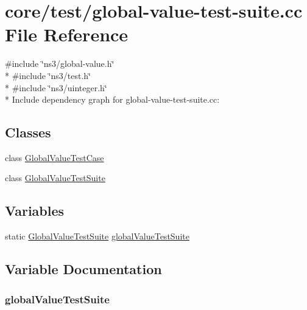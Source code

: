 \hypertarget{global-value-test-suite_8cc}{}\section{core/test/global-\/value-\/test-\/suite.cc File Reference}
\label{global-value-test-suite_8cc}
{\ttfamily \#include \char`\"{}ns3/global-\/value.\+h\char`\"{}}\\*
{\ttfamily \#include \char`\"{}ns3/test.\+h\char`\"{}}\\*
{\ttfamily \#include \char`\"{}ns3/uinteger.\+h\char`\"{}}\\*
Include dependency graph for global-\/value-\/test-\/suite.cc\+:
\subsection*{Classes}
\begin{DoxyCompactItemize}
\item 
class \hyperlink{classGlobalValueTestCase}{Global\+Value\+Test\+Case}
\item 
class \hyperlink{classGlobalValueTestSuite}{Global\+Value\+Test\+Suite}
\end{DoxyCompactItemize}
\subsection*{Variables}
\begin{DoxyCompactItemize}
\item 
static \hyperlink{classGlobalValueTestSuite}{Global\+Value\+Test\+Suite} \hyperlink{global-value-test-suite_8cc_acbcdc2625b663bbb3dff9ce0fe840178}{global\+Value\+Test\+Suite}
\end{DoxyCompactItemize}


\subsection{Variable Documentation}
\subsubsection[{\texorpdfstring{global\+Value\+Test\+Suite}{globalValueTestSuite}}]{ global\+Value\+Test\+Suite\hspace{0.3cm}{\ttfamily [static]}}\hypertarget{global-value-test-suite_8cc_acbcdc2625b663bbb3dff9ce0fe840178}{}\label{global-value-test-suite_8cc_acbcdc2625b663bbb3dff9ce0fe840178}
